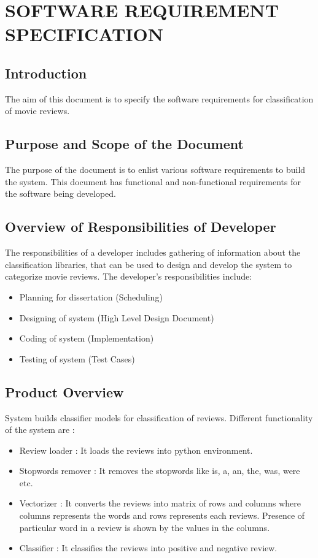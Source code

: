 \documentclass[oneside,a4paper,12pt]{pictreport}
\begin{document}
\chapter{SOFTWARE REQUIREMENT SPECIFICATION}

\section{Introduction}
The aim of this document is to specify the software requirements for classification of movie reviews.

\section{Purpose and Scope of the Document}
The purpose of the document is to enlist various software requirements to build the system. This document has functional and non-functional requirements for the software being developed.

\section{Overview of Responsibilities of Developer}
The responsibilities of a developer includes gathering of information about the classification libraries, that can be used to design and develop the system to categorize movie reviews. The developer’s responsibilities include: 
\begin{itemize}
\item Planning for dissertation (Scheduling) 
\item Designing of system (High Level Design Document)
\item Coding of system (Implementation)
\item Testing of system (Test Cases)
\end{itemize}

\section{Product Overview}
System builds classifier models for classification of reviews. Different functionality of the system are : 

\begin{itemize}
\item Review loader : It loads the reviews into python environment.
\item Stopwords remover : It removes the stopwords like is, a, an, the, was, were etc.
\item Vectorizer : It converts the reviews into matrix of rows and columns where columns represents the words
and rows represents each reviews. Presence of particular word in a review is shown by the values in the columns.
\item Classifier : It classifies the reviews into positive and negative review.
\end{itemize}
\end{document}
